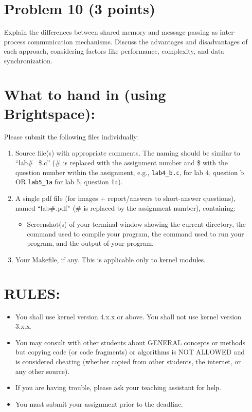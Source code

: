 \documentclass{article}
\begin{document}
\section*{Problem 10 (3 points)}

Explain the differences between shared memory and message passing as inter-process communication mechanisms. Discuss the advantages and disadvantages of each approach, considering factors like performance, complexity, and data synchronization.


\section*{What to hand in (using Brightspace): }

Please submit the following files individually:

\begin{enumerate}
    \item Source file(s) with appropriate comments. The naming should be similar to “lab\#\_\$.c” (\# is replaced with the assignment number and \$ with the question number within the assignment, e.g., \texttt{lab4\_b.c}, for lab 4, question b OR \texttt{lab5\_1a} for lab 5, question 1a).
    \item A single pdf file (for images + report/answers to short-answer questions), named “lab\#.pdf” (\# is replaced by the assignment number), containing:
    \begin{itemize}
        \item Screenshot(s) of your terminal window showing the current directory, the command used to compile your program, the command used to run your program, and the output of your program.
    \end{itemize}
    \item Your Makefile, if any. This is applicable only to kernel modules.
\end{enumerate}

\section*{RULES:}

\begin{itemize}
    \item You shall use kernel version 4.x.x or above. You shall not use kernel version 3.x.x.
    \item You may consult with other students about GENERAL concepts or methods but copying code (or code fragments) or algorithms is NOT ALLOWED and is considered cheating (whether copied from other students, the internet, or any other source).
    \item If you are having trouble, please ask your teaching assistant for help.
    \item You must submit your assignment prior to the deadline.
\end{itemize}
\end{document}
